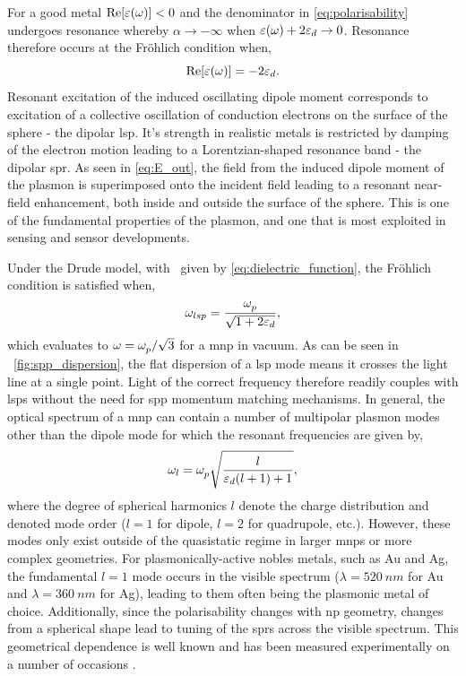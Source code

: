 \documentclass{article}
\begin{document}
For a good metal $\mathrm{Re}\!\left[{\varepsilon(\omega)}\right]<0$ and the denominator in \eqref{eq:polarisability} undergoes resonance whereby $\alpha\rightarrow-\infty$ when $\varepsilon(\omega)+2\varepsilon_d\rightarrow0$. Resonance therefore occurs at the Fr\"{o}hlich condition when,
\begin{equation}
\mathrm{Re}\!\left[{\varepsilon(\omega)}\right] = -2\varepsilon_d. \label{eq:frohlich}
\end{equation}
Resonant excitation of the induced oscillating dipole moment corresponds to excitation of a collective oscillation of conduction electrons on the surface of the sphere - the dipolar \gls{lsp}. It's strength in realistic metals is restricted by damping of the electron motion leading to a Lorentzian-shaped resonance band - the dipolar \gls{spr}. As seen in \eqref{eq:E_out}, the field from the induced dipole moment of the plasmon is superimposed onto the incident field leading to a resonant near-field enhancement, both inside and outside the surface of the sphere. This is one of the fundamental properties of the plasmon, and one that is most exploited in sensing and sensor developments.

Under the Drude model, with \dielectric\ given by \eqref{eq:dielectric_function}, the Fr\"{o}hlich condition is satisfied when,
\begin{equation}
\omega_{lsp} = \frac{\omega_{p}^{}}{\sqrt{1+2\varepsilon_d}},
\end{equation}
which evaluates to $\omega = \omega_{p}^{}/\sqrt{3}$ for a \gls{mnp} in vacuum. As can be seen in \figurename~\ref{fig:spp_dispersion}, the flat dispersion of a \gls{lsp} mode means it crosses the light line at a single point. Light of the correct frequency therefore readily couples with \glspl{lsp} without the need for \gls{spp} momentum matching mechanisms.
In general, the optical spectrum of a \gls{mnp} can contain a number of multipolar plasmon modes {\color{red}other than the dipole mode} for which the resonant frequencies are given by,
\begin{equation}
\omega_l = \omega_{p}^{}\sqrt{\frac{l}{\varepsilon_d(l+1)+1}},
\end{equation}
where the degree of spherical harmonics $l$ denote the charge distribution and denoted mode order ($l=1$ for dipole, $l=2$ for quadrupole, etc.). However, these modes only exist outside of the quasistatic regime in larger \glspl{mnp} or more complex geometries.
For plasmonically-active nobles metals, such as Au and Ag, the fundamental $l=1$ mode occurs in the visible spectrum ($\lambda=\SI{520}{nm}$ for Au and $\lambda=\SI{360}{nm}$ for Ag), leading to them often being the plasmonic metal of choice.
Additionally, since the polarisability changes with \gls{np} geometry, changes from a spherical shape lead to tuning of the \glspl{spr} across the visible spectrum. This geometrical dependence is well known and has been measured experimentally on a number of occasions \cite{mock2002, kuwata2003}.
\end{document}
